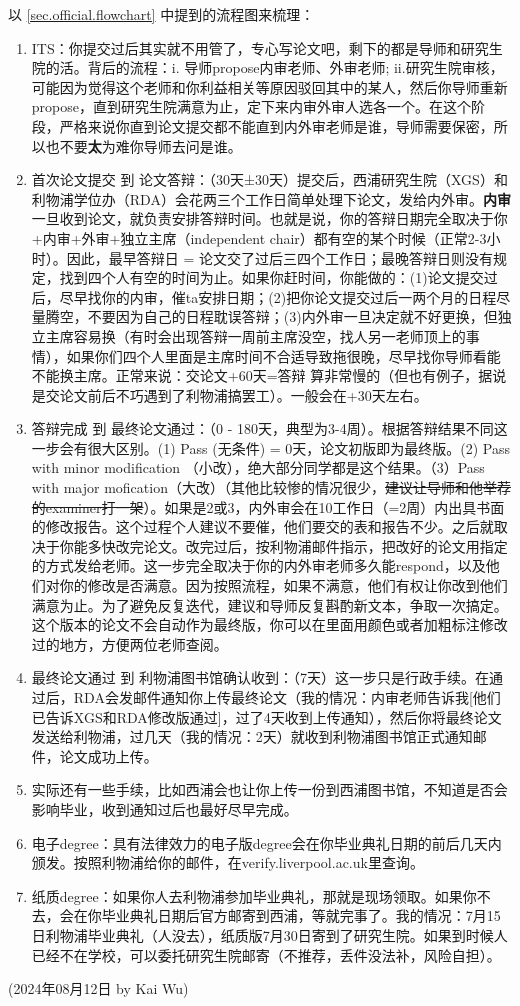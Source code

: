 以 \ref{sec.official.flowchart} 中提到的流程图来梳理：
\begin{enumerate}
    \item ITS：你提交过后其实就不用管了，专心写论文吧，剩下的都是导师和研究生院的活。背后的流程：i. 导师propose内审老师、外审老师; ii.研究生院审核，可能因为觉得这个老师和你利益相关等原因驳回其中的某人，然后你导师重新propose，直到研究生院满意为止，定下来内审外审人选各一个。在这个阶段，严格来说你直到论文提交都不能直到内外审老师是谁，导师需要保密，所以也不要\textbf{太}为难你导师去问是谁。
    \item 首次论文提交 到 论文答辩：（30天±30天）提交后，西浦研究生院（XGS）和利物浦学位办（RDA）会花两三个工作日简单处理下论文，发给内外审。\textbf{内审}一旦收到论文，就负责安排答辩时间。也就是说，你的答辩日期完全取决于你+内审+外审+独立主席（independent chair）都有空的某个时候（正常2-3小时）。因此，最早答辩日 = 论文交了过后三四个工作日；最晚答辩日则没有规定，找到四个人有空的时间为止。如果你赶时间，你能做的：(1)论文提交过后，尽早找你的内审，催ta安排日期；(2)把你论文提交过后一两个月的日程尽量腾空，不要因为自己的日程耽误答辩；(3)内外审一旦决定就不好更换，但独立主席容易换（有时会出现答辩一周前主席没空，找人另一老师顶上的事情），如果你们四个人里面是主席时间不合适导致拖很晚，尽早找你导师看能不能换主席。正常来说：交论文+60天=答辩 算非常慢的（但也有例子，据说是交论文前后不巧遇到了利物浦搞罢工）。一般会在+30天左右。
    \item 答辩完成 到 最终论文通过：（0 - 180天，典型为3-4周）。根据答辩结果不同这一步会有很大区别。(1) Pass (无条件) = 0天，论文初版即为最终版。(2) Pass with minor modification （小改），绝大部分同学都是这个结果。（3）Pass with major mofication（大改）（其他比较惨的情况很少，\sout{建议让导师和他举荐的examiner打一架}）。如果是2或3，内外审会在10工作日（=2周）内出具书面的修改报告。这个过程个人建议不要催，他们要交的表和报告不少。之后就取决于你能多快改完论文。改完过后，按利物浦邮件指示，把改好的论文用指定的方式发给老师。这一步完全取决于你的内外审老师多久能respond，以及他们对你的修改是否满意。因为按照流程，如果不满意，他们有权让你改到他们满意为止。为了避免反复迭代，建议和导师反复斟酌新文本，争取一次搞定。这个版本的论文不会自动作为最终版，你可以在里面用颜色或者加粗标注修改过的地方，方便两位老师查阅。
    \item 最终论文通过 到 利物浦图书馆确认收到：（7天）这一步只是行政手续。在通过后，RDA会发邮件通知你上传最终论文（我的情况：内审老师告诉我[他们已告诉XGS和RDA修改版通过]，过了4天收到上传通知），然后你将最终论文发送给利物浦，过几天（我的情况：2天）就收到利物浦图书馆正式通知邮件，论文成功上传。
    \item 实际还有一些手续，比如西浦会也让你上传一份到西浦图书馆，不知道是否会影响毕业，收到通知过后也最好尽早完成。
    \item 电子degree：具有法律效力的电子版degree会在你毕业典礼日期的前后几天内颁发。按照利物浦给你的邮件，在verify.liverpool.ac.uk里查询。
    \item 纸质degree：如果你人去利物浦参加毕业典礼，那就是现场领取。如果你不去，会在你毕业典礼日期后官方邮寄到西浦，等就完事了。我的情况：7月15日利物浦毕业典礼（人没去），纸质版7月30日寄到了研究生院。如果到时候人已经不在学校，可以委托研究生院邮寄（不推荐，丢件没法补，风险自担）。
\end{enumerate}

\begin{flushright}
    (2024年08月12日 by Kai Wu)
\end{flushright}
